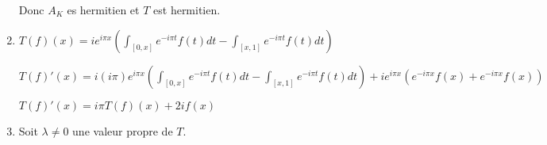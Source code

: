 \documentclass[10pt,a4paper,oneside]{article}
\newenvironment{solution}[1][Solution]{\begin{trivlist}
\item[\hskip \labelsep {\bfseries #1}]}{\end{trivlist}}
\begin{document}
\begin{solution}
\begin{enumerate}
Donc $A_K$ es hermitien et $T$ est hermitien.

\item
$T(f)(x) = ie^{i \pi x}(\int_{[0,x]}e^{-i \pi t} f(t) dt - \int_{[x,1]}e^{-i \pi t} f(t) dt)$

$T(f)'(x) = i(i \pi) e^{i \pi x} (\int_{[0,x]}e^{-i \pi t} f(t) dt - \int_{[x,1]}e^{-i \pi t} f(t) dt) + i e^{i \pi x} (e^{-i \pi x}f(x) + e^{-i \pi x}f(x))$

$\boxed{T(f)'(x) = i \pi T(f)(x) + 2i f(x)}$

\item
Soit $\lambda \neq 0$ une valeur propre de $T$.



\end{enumerate}
\end{solution}
\end{document}
